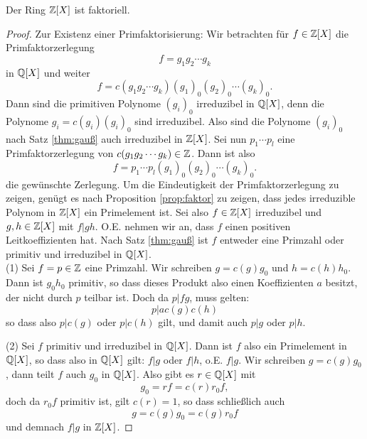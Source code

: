 \documentclass{book}
\begin{document}
\begin{thm}
    \label{thm:zxfaktoriell}
    Der Ring $\mathbb{Z}[X]$ ist faktoriell.
\end{thm}
\begin{proof}
    Zur Existenz einer Primfaktorisierung: Wir betrachten für $f \in \mathbb{Z}[X]$ die Primfaktorzerlegung
    \[
        f  = g_1 g_2 \cdots g_k
    \]
    in $\mathbb{Q}[X]$ und weiter
    \[
        f  = c(g_1 g_2 \cdots g_k) (g_1)_0 (g_2)_0 \cdots (g_k)_0.
    \]
    Dann sind die primitiven Polynome $(g_i)_0$ irreduzibel in $\mathbb{Q}[X]$, denn
    die Polynome $g_i = c(g_i) (g_i)_0$ sind irreduzibel. Also sind die
    Polynome $(g_i)_0$ nach Satz \ref{thm:gauß} auch irreduzibel in $\mathbb{Z}[X]$.
    Sei nun $p_1 \cdots p_l$ eine Primfaktorzerlegung von $c(g_1 g_2 \cdots
    g_k) \in \mathbb{Z}$. Dann ist also 
    \[
        f = p_1 \cdots p_l (g_1)_0 (g_2)_0 \cdots (g_k)_0.
    \]
    die gewünschte Zerlegung. Um die Eindeutigkeit der Primfaktorzerlegung zu
    zeigen, genügt es nach Proposition \ref{prop:faktor} zu zeigen, dass jedes
    irreduzible Polynom in $\mathbb{Z}[X]$ ein Primelement ist. Sei also $f \in
    \mathbb{Z}[X]$ irreduzibel und $g,h \in \mathbb{Z}[X]$ mit $f | gh$. O.E. nehmen wir an,
    dass $f$ einen positiven Leitkoeffizienten hat. Nach Satz \ref{thm:gauß}
    ist $f$ entweder eine Primzahl oder primitiv und irreduzibel in $\mathbb{Q}[X]$.\\

    \noindent
    (1) Sei $f=p \in \mathbb{Z}$ eine Primzahl. Wir schreiben $g = c(g) g_0$ und $h = c(h) h_0$.
    Dann ist $g_0 h_0$ primitiv, so dass dieses Produkt also einen
    Koeffizienten $a$ besitzt, der nicht durch $p$ teilbar ist. Doch da $p | fg$, muss gelten:
    \[
        p | a c(g)c(h)
    \]
    so dass also $p| c(g)$ oder $p | c(h)$ gilt, und damit auch $p | g$ oder $p | h$. 
    
    \noindent
    (2) Sei $f$ primitiv und irreduzibel in $\mathbb{Q}[X]$. Dann ist $f$ also ein
    Primelement in $\mathbb{Q}[X]$, so dass also in $\mathbb{Q}[X]$ gilt: $f | g$ oder $f | h$,
    o.E. $f | g$. Wir schreiben $g = c(g) g_0$, dann teilt $f$ auch $g_0$ in
    $\mathbb{Q}[X]$. Also gibt es $r \in \mathbb{Q}[X]$ mit 
    \[
        g_0 = rf = c(r) r_0 f,
    \]
    doch da $r_0 f$ primitiv ist, gilt $c(r) = 1$, so dass schließlich auch 
    \[
        g = c(g) g_0 = c(g) r_0 f
    \]
    und demnach $f | g$ in $\mathbb{Z}[X]$. 
\end{proof}
\end{document}
